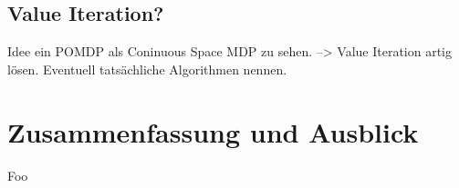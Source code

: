 \documentclass[a4paper]{IEEEtran}
\begin{document}
\subsection{Value Iteration?}
Idee ein POMDP als Coninuous Space MDP zu sehen. --> Value Iteration artig lösen. Eventuell tatsächliche Algorithmen nennen.

\section{Zusammenfassung und Ausblick}
Foo



\end{document}
